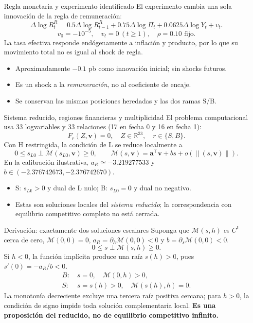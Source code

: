 \documentclass[aspectratio=169,11pt]{beamer}
\begin{document}
\begin{frame}{Regla monetaria y experimento identificado}
\small
El experimento cambia una sola innovación de la regla de remuneración:
\[
\Delta\log R^R_t
=0.5\Delta\log R^R_{t-1}
+0.75\Delta\log\Pi_t+0.0625\Delta\log Y_t+v_t.
\]
\[
v_0=-10^{-5},\quad v_t=0\ (t\geq1),\quad
\rho=0.10\text{ fijo.}
\]
La tasa efectiva responde endógenamente a inflación y producto, por lo
que su movimiento total no es igual al shock de regla.
\medskip
\begin{itemize}
\item Aproximadamente $-0.1$ pb como innovación inicial; sin shocks futuros.
\item Es un shock a la \emph{remuneración}, no al coeficiente de encaje.
\item Se conservan las mismas posiciones heredadas y las dos ramas S/B.
\end{itemize}
\end{frame}

\begin{frame}{Sistema reducido, regiones financieras y multiplicidad}
\small
El problema computacional usa 33 logvariables y 33 relaciones
(17 en fecha 0 y 16 en fecha 1):
\[
F_r(Z,\mathbf v)=0,\quad Z\in\mathbb R^{33},\quad r\in\{S,B\}.
\]
Con H restringida, la condición de L se reduce localmente a
\[
0\leq s_{L0}\perp\mathcal M(s_{L0},\mathbf v)\geq0,\qquad
\mathcal M(s,\mathbf v)=\mathbf a^\top\mathbf v+bs
+o(\|(s,\mathbf v)\|).
\]
En la calibración ilustrativa, $a_R\simeq-3.219277533$ y
$b\in(-2.376742673,-2.376742670)$.
\begin{itemize}
\item S: $s_{L0}>0$ y dual de L nulo; B: $s_{L0}=0$ y dual no negativo.
\item Estas son soluciones locales del \emph{sistema reducido}; la
correspondencia con equilibrio competitivo completo no está cerrada.
\end{itemize}
\end{frame}

\begin{frame}{Derivación: exactamente dos soluciones escalares}
\small
Suponga que $\mathcal M(s,h)$ es $C^1$ cerca de cero,
$\mathcal M(0,0)=0$, $a_R=\partial_h\mathcal M(0,0)<0$
y $b=\partial_s\mathcal M(0,0)<0$.
\[
0\leq s\perp \mathcal M(s,h)\geq0.
\]
Si $h<0$, la función implícita produce una
raíz $s(h)>0$, pues $s'(0)=-a_R/b<0$.
\[
\boxed{\begin{aligned}
B:&\ s=0,\quad \mathcal M(0,h)>0,\\
S:&\ s=s(h)>0,\quad \mathcal M(s(h),h)=0.
\end{aligned}}
\]
\footnotesize
La monotonía decreciente excluye una tercera raíz
positiva cercana; para $h>0$, la condición de signo
impide toda solución complementaria local.
\textbf{Es una proposición del reducido, no de
equilibrio competitivo infinito.}
\end{frame}
\end{document}
